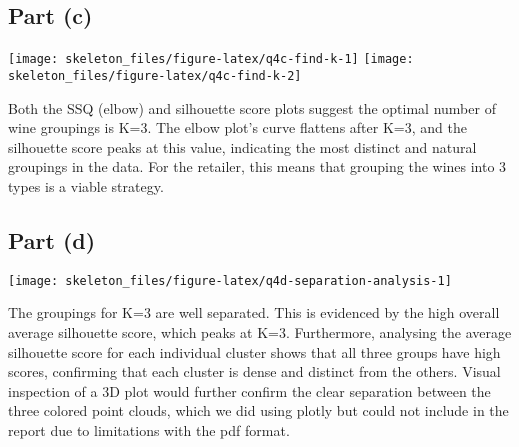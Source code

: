 \documentclass[12pt,halfline,a4paper,]{ouparticle}
\begin{document}
\subsection{Part (c)}\label{part-c-2}

\texttt{[image: skeleton\_files/figure-latex/q4c-find-k-1]}
\texttt{[image: skeleton\_files/figure-latex/q4c-find-k-2]}

Both the SSQ (elbow) and silhouette score plots suggest the optimal
number of wine groupings is K=3. The elbow plot's curve flattens after
K=3, and the silhouette score peaks at this value, indicating the most
distinct and natural groupings in the data. For the retailer, this means
that grouping the wines into 3 types is a viable strategy.

\subsection{Part (d)}\label{part-d-1}

\texttt{[image: skeleton\_files/figure-latex/q4d-separation-analysis-1]}

The groupings for K=3 are well separated. This is evidenced by the high
overall average silhouette score, which peaks at K=3. Furthermore,
analysing the average silhouette score for each individual cluster shows
that all three groups have high scores, confirming that each cluster is
dense and distinct from the others. Visual inspection of a 3D plot would
further confirm the clear separation between the three colored point
clouds, which we did using plotly but could not include in the report
due to limitations with the pdf format.
\end{document}
